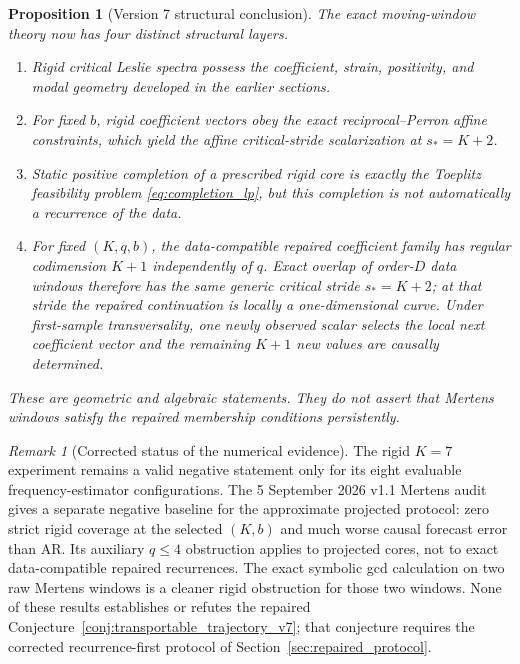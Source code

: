 \documentclass[11pt]{amsart}
\numberwithin{equation}{section}
\theoremstyle{plain}
\newtheorem{proposition}[theorem]{Proposition}
\theoremstyle{definition}
\theoremstyle{remark}
\newtheorem{remark}[theorem]{Remark}
\begin{document}
\begin{proposition}[Version 7 structural conclusion]
\label{prop:final_conclusion_v7}
The exact moving-window theory now has four distinct structural layers.
\begin{enumerate}
\item Rigid critical Leslie spectra possess the coefficient, strain, positivity, and modal geometry developed in the earlier sections.
\item For fixed $b$, rigid coefficient vectors obey the exact reciprocal--Perron affine constraints, which yield the affine critical-stride scalarization at $s_*=K+2$.
\item Static positive completion of a prescribed rigid core is exactly the Toeplitz feasibility problem \eqref{eq:completion_lp}, but this completion is not automatically a recurrence of the data.
\item For fixed $(K,q,b)$, the data-compatible repaired coefficient family has regular codimension $K+1$ independently of $q$. Exact overlap of order-$D$ data windows therefore has the same generic critical stride $s_*=K+2$; at that stride the repaired continuation is locally a one-dimensional curve. Under first-sample transversality, one newly observed scalar selects the local next coefficient vector and the remaining $K+1$ new values are causally determined.
\end{enumerate}
These are geometric and algebraic statements. They do not assert that Mertens windows satisfy the repaired membership conditions persistently.
\end{proposition}

\begin{remark}[Corrected status of the numerical evidence]
\label{rem:final_status_v7}
The rigid $K=7$ experiment remains a valid negative statement only for its eight evaluable frequency-estimator configurations. The 5 September 2026 v1.1 Mertens audit gives a separate negative baseline for the approximate projected protocol: zero strict rigid coverage at the selected $(K,b)$ and much worse causal forecast error than AR. Its auxiliary $q\leq4$ obstruction applies to projected cores, not to exact data-compatible repaired recurrences. The exact symbolic gcd calculation on two raw Mertens windows is a cleaner rigid obstruction for those two windows. None of these results establishes or refutes the repaired Conjecture~\ref{conj:transportable_trajectory_v7}; that conjecture requires the corrected recurrence-first protocol of Section~\ref{sec:repaired_protocol}.
\end{remark}
\end{document}
